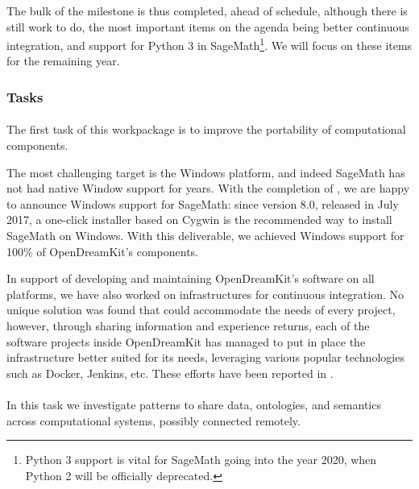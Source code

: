   The bulk of the milestone is thus completed, ahead of schedule,
  although there is still work to do, the most important items on the
  agenda being better continuous integration, and support for Python 3
  in SageMath\footnote{Python 3 support is vital for SageMath going
    into the year 2020, when Python 2 will be officially
    deprecated.}. We will focus on these items for the remaining year.
  
\subsubsection{Tasks}

  \paragraph{}
  \label{component-architecture@portability}
  The first task of this workpackage is to improve the portability of
  computational components.

  The most challenging target is the Windows platform, and indeed
  SageMath has not had native Window support for years. With the
  completion of
  , we are
  happy to announce Windows support for SageMath: since version 8.0,
  released in July 2017, a one-click installer based on Cygwin is the
  recommended way to install SageMath on Windows. With this
  deliverable, we achieved Windows support for 100\% of OpenDreamKit's
  components.

  In support of developing and maintaining OpenDreamKit's software on
  all platforms, we have also worked on infrastructures for continuous
  integration. No unique solution was found that could accommodate the
  needs of every project, however, through sharing information and
  experience returns, each of the software projects inside
  OpenDreamKit has managed to put in place the infrastructure better
  suited for its needs, leveraging various popular technologies such
  as Docker, Jenkins, etc. These efforts have been reported in
  .

  \paragraph{}
  \label{component-architecture@interface-systems}
  In this task we investigate patterns to share data, ontologies,
  and semantics across computational systems, possibly connected
  remotely.

